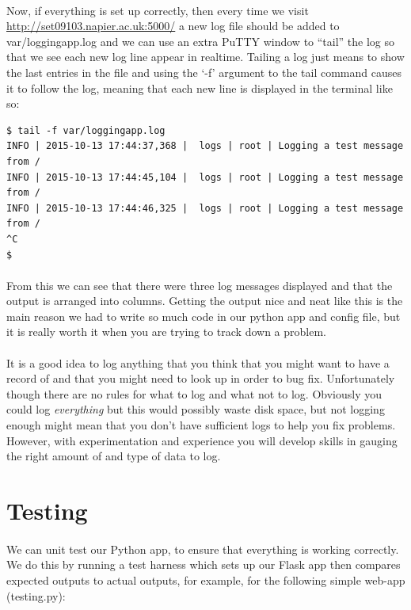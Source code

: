 \documentclass[12pt, a4paper, oneside]{book}
\begin{document}
{\paragraph{} Now, if everything is set up correctly, then every time we visit \url{http://set09103.napier.ac.uk:5000/} a new log file should be added to var/loggingapp.log and we can use an extra PuTTY window to ``tail'' the log so that we see each new log line appear in realtime. Tailing a log just means to show the last entries in the file and using the `-f' argument to the tail command causes it to follow the log, meaning that each new line is displayed in the terminal like so:

\begin{lstlisting}[style=DOS]
$ tail -f var/loggingapp.log 
INFO | 2015-10-13 17:44:37,368 |  logs | root | Logging a test message from /
INFO | 2015-10-13 17:44:45,104 |  logs | root | Logging a test message from /
INFO | 2015-10-13 17:44:46,325 |  logs | root | Logging a test message from /
^C
$ 
\end{lstlisting}

\paragraph{} From this we can see that there were three log messages displayed and that the output is arranged into columns. Getting the output nice and neat like this is the main reason we had to write so much code in our python app and config file, but it is really worth it when you are trying to track down a problem.

\paragraph{} It is a good idea to log anything that you think that you might want to have a record of and that you might need to look up in order to bug fix. Unfortunately though there are no rules for what to log and what not to log. Obviously you could log \emph{everything} but this would possibly waste disk space, but not logging enough might mean that you don't have sufficient logs to help you fix problems. However, with experimentation and experience you will develop skills in gauging the right amount of and type of data to log.

\section{Testing}
\label{testing}
\paragraph{} We can unit test our Python app, to ensure that everything is working correctly. We do this by running a test harness which sets up our Flask app then compares expected outputs to actual outputs, for example, for the following simple web-app (testing.py):

}
\end{document}
